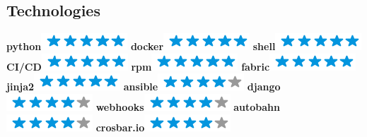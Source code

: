 \documentclass[]{friggeri-cv}
\begin{document}
\begin{aside}
    \section{Technologies}
        \textbf{python}\includegraphics[scale=0.40]{img/5stars.png}
        \textbf{docker}\includegraphics[scale=0.40]{img/5stars.png}
        \textbf{shell}\includegraphics[scale=0.40]{img/5stars.png}
        \textbf{CI/CD}\includegraphics[scale=0.40]{img/5stars.png}
        \textbf{rpm}\includegraphics[scale=0.40]{img/5stars.png}
        \textbf{fabric}\includegraphics[scale=0.40]{img/5stars.png}
        \textbf{jinja2}\includegraphics[scale=0.40]{img/5stars.png}
        \textbf{ansible}\includegraphics[scale=0.40]{img/4stars.png}
        \textbf{django}\includegraphics[scale=0.40]{img/4stars.png}
        \textbf{webhooks}\includegraphics[scale=0.40]{img/4stars.png}
        \textbf{autobahn}\includegraphics[scale=0.40]{img/4stars.png}
        \textbf{crosbar.io}\includegraphics[scale=0.40]{img/4stars.png}

\end{aside}
\end{document}
